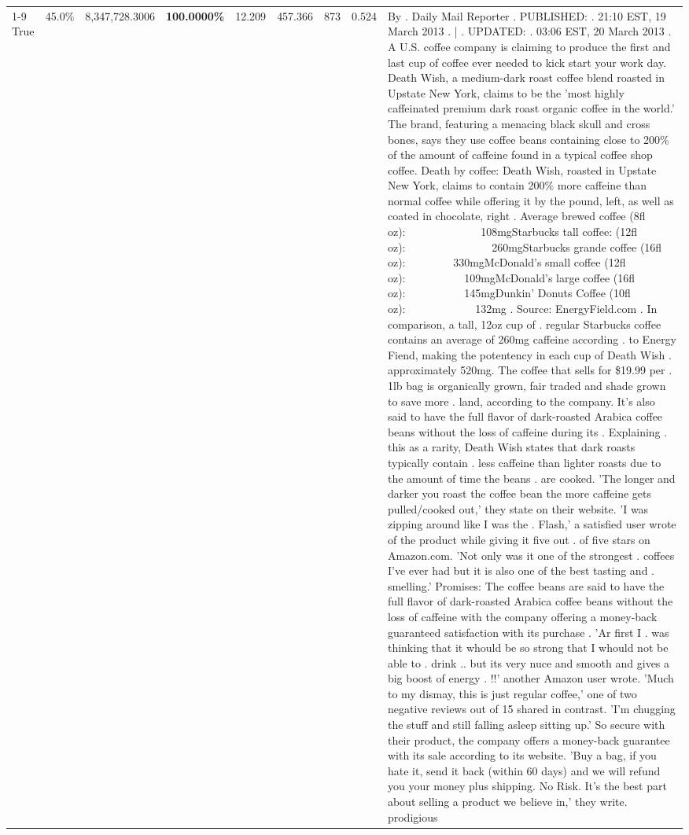\begin{table}[H]
{\begin{tabular}{lllrlllll}
\cline{1-9}
True & 45.0\% & 8,347,728.3006 & \bfseries \color{red} 100.0000\% & 12.209 & 457.366 & 873 & 0.524 & By . Daily Mail Reporter . PUBLISHED: . 21:10 EST, 19 March 2013 . | . UPDATED: . 03:06 EST, 20 March 2013 . A U.S. coffee company is claiming to produce the first and last cup of coffee ever needed to kick start your work day. Death Wish, a medium-dark roast coffee blend roasted in Upstate New York, claims to be the 'most highly caffeinated premium dark roast organic coffee in the world.' The brand, featuring a menacing black skull and cross bones, says they use coffee beans containing close to 200\% of the amount of caffeine found in a typical coffee shop coffee. Death by coffee: Death Wish, roasted in Upstate New York, claims to contain 200\% more caffeine than normal coffee while offering it by the pound, left, as well as coated in chocolate, right . Average brewed coffee (8fl oz):              108mgStarbucks tall coffee: (12fl oz):                260mgStarbucks grande coffee (16fl oz):         330mgMcDonald's small coffee (12fl oz):           109mgMcDonald's large coffee (16fl oz):           145mgDunkin' Donuts Coffee (10fl oz):             132mg . Source: EnergyField.com . In comparison, a tall, 12oz cup of . regular Starbucks coffee contains an average of 260mg caffeine according . to Energy Fiend, making the potentency in each cup of Death Wish . approximately 520mg. The coffee that sells for \$19.99 per . 1lb bag is organically grown, fair traded and shade grown to save more . land, according to the company. It's also said to have the full flavor of dark-roasted Arabica coffee beans without the loss of caffeine during its . Explaining . this as a rarity, Death Wish states that dark roasts typically contain . less caffeine than lighter roasts due to the amount of time the beans . are cooked. 'The longer and darker you roast the coffee bean the more caffeine gets pulled/cooked out,' they state on their website. 'I was zipping around like I was the . Flash,' a satisfied user wrote of the product while giving it five out . of five stars on Amazon.com. 'Not only was it one of the strongest . coffees I've ever had but it is also one of the best tasting and . smelling.’ Promises: The coffee beans are said to have the full flavor of dark-roasted Arabica coffee beans without the loss of caffeine with the company offering a money-back guaranteed satisfaction with its purchase . 'Ar first I . was thinking that it whould be so strong that I whould not be able to . drink .. but its very nuce and smooth and gives a big boost of energy . !!' another Amazon user wrote. 'Much to my dismay, this is just regular coffee,' one of two negative reviews out of 15 shared in contrast. 'I'm chugging the stuff and still falling asleep sitting up.' So secure with their product, the company offers a money-back guarantee with its sale according to its website. 'Buy a bag, if you hate it, send it back (within 60 days) and we will refund you your money plus shipping. No Risk. It’s the best part about selling a product we believe in,' they write. prodigious \\

\end{tabular}}
\end{table}

